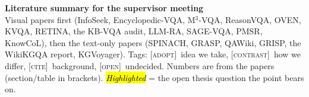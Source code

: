 \documentclass[10pt,a4paper]{article}
\newcommand{\adopt}{\textsc{[adopt]}}
\newcommand{\contrast}{\textsc{[contrast]}}
\newcommand{\cit}{\textsc{[cite]}}
\newcommand{\open}{\textsc{[open]}}
\newcommand{\q}[1]{\hl{\footnotesize\itshape #1}}
\begin{document}
\begin{center}
  {\large\bfseries Literature summary for the supervisor meeting}\\[2pt]
  {\small Visual papers first (InfoSeek, Encyclopedic-VQA, M$^3$-VQA,
      ReasonVQA, OVEN, KVQA, RETINA, the KB-VQA audit, LLM-RA, SAGE-VQA,
    PMSR, KnowCoL), then the text-only papers
    (SPINACH, GRASP, QAWiki, GRISP, the WikiKGQA report, KGVoyager).
    Tags: \adopt\ idea we take, \contrast\ how we differ,
    \cit\ background, \open\ undecided.
    Numbers are from the papers (section/table in brackets).
  \q{Highlighted} = the open thesis question the point bears on.}
\end{center}

\end{document}
